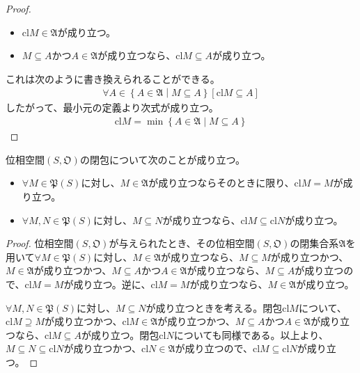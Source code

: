 \documentclass[dvipdfmx]{jsarticle}
\begin{document}
\begin{proof}
\begin{itemize}
\item
  ${\mathrm{cl}}M\in \mathfrak{A}$が成り立つ。
\item
  $M \subseteq A$かつ$A \in \mathfrak{A}$が成り立つなら、${\mathrm{cl}}M \subseteq A$が成り立つ。
\end{itemize}
これは次のように書き換えられることができる。
\begin{align*}
\forall A \in \left\{ A \in \mathfrak{A} \middle| M \subseteq A \right\}\left[ {\mathrm{cl}}M \subseteq A \right]
\end{align*}
したがって、最小元の定義より次式が成り立つ。
\begin{align*}
{\mathrm{cl}}M = \min\left\{ A \in \mathfrak{A} \middle| M \subseteq A \right\}
\end{align*}
\end{proof}
\begin{thm}\label{8.1.1.7}
位相空間$\left( S,\mathfrak{O} \right)$の閉包について次のことが成り立つ。
\begin{itemize}
\item
  $\forall M \in \mathfrak{P}(S)$に対し、$M \in \mathfrak{A}$が成り立つならそのときに限り、${\mathrm{cl}}M = M$が成り立つ。
\item
  $\forall M,N \in \mathfrak{P}(S)$に対し、$M \subseteq N$が成り立つなら、${\mathrm{cl}}M \subseteq {\mathrm{cl}}N$が成り立つ。
\end{itemize}
\end{thm}
\begin{proof}
位相空間$\left( S,\mathfrak{O} \right)$が与えられたとき、その位相空間$\left( S,\mathfrak{O} \right)$の閉集合系$\mathfrak{A}$を用いて$\forall M \in \mathfrak{P}(S)$に対し、$M \in \mathfrak{A}$が成り立つなら、$M \subseteq M$が成り立つかつ、$M \in \mathfrak{A}$が成り立つかつ、$M \subseteq A$かつ$A \in \mathfrak{A}$が成り立つなら、$M \subseteq A$が成り立つので、${\mathrm{cl}}M = M$が成り立つ。逆に、${\mathrm{cl}}M = M$が成り立つなら、$M \in \mathfrak{A}$が成り立つ。\par
$\forall M,N \in \mathfrak{P}(S)$に対し、$M \subseteq N$が成り立つときを考える。閉包${\mathrm{cl}}M$について、${\mathrm{cl}}M \supseteq M$が成り立つかつ、${\mathrm{cl}}M\in \mathfrak{A}$が成り立つかつ、$M \subseteq A$かつ$A \in \mathfrak{A}$が成り立つなら、${\mathrm{cl}}M \subseteq A$が成り立つ。閉包${\mathrm{cl}}N$についても同様である。以上より、$M \subseteq N \subseteq {\mathrm{cl}}N$が成り立つかつ、${\mathrm{cl}}N\in \mathfrak{A}$が成り立つので、${\mathrm{cl}}M \subseteq {\mathrm{cl}}N$が成り立つ。
\end{proof}
\end{document}
